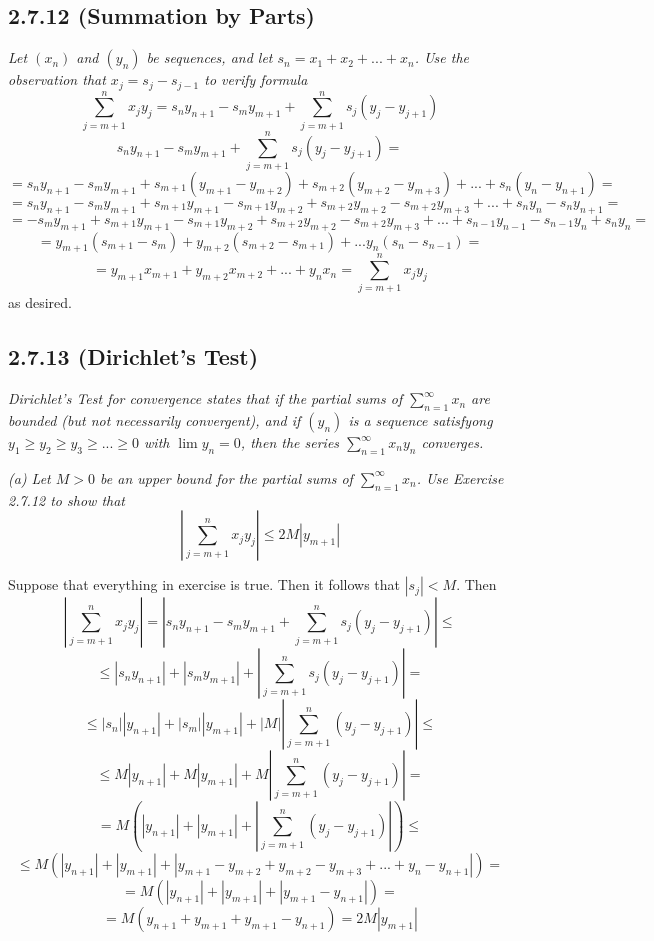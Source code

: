 \documentclass[11pt,oneside,titlepage]{book}
\begin{document}
\subsection*{2.7.12 (Summation by Parts)}
\textit{Let $(x_n)$ and $(y_n)$ be sequences, and let
  $s_n = x_1 + x_2 + ... + x_n$. Use the observation that
  $x_j = s_j - s_{j - 1}$ to verify formula }
$$\sum_{j = m + 1}^{n} x_j y_j = s_n y_{n + 1} - s_m y_{m + 1} +
\sum_{j = m + 1}^{n} s_j (y_j - y_{j + 1})$$
$$s_n y_{n + 1} - s_m y_{m + 1} +
\sum_{j = m + 1}^{n} s_j (y_j - y_{j + 1}) = $$
$$ = s_n y_{n + 1} - s_m y_{m + 1} +
s_{m + 1} (y_{m + 1} - y_{m + 2}) +
s_{m + 2} (y_{m + 2} - y_{m + 3}) +
... +
s_{n} (y_{n} - y_{n + 1}) = $$
$$ = s_n y_{n + 1} - s_m y_{m + 1} +
s_{m + 1} y_{m + 1} - s_{m + 1} y_{m + 2} +
s_{m + 2} y_{m + 2} - s_{m + 2} y_{m + 3} +
... +
s_{n} y_{n} - s_{n} y_{n + 1} = $$
$$ =  - s_m y_{m + 1} +
s_{m + 1} y_{m + 1} - s_{m + 1} y_{m + 2} +
s_{m + 2} y_{m + 2} - s_{m + 2} y_{m + 3} +
... + s_{n - 1} y_{n - 1} - s_{n - 1} y_{n}
+ s_{n} y_{n}  = $$
$$ =  y_{m + 1}(s_{m + 1} - s_m ) +
y_{m + 2}(s_{m + 2} - s_{m + 1} ) +
...   y_{n}( s_{n} - s_{n - 1})  = $$
$$ = y_{m + 1} x_{m + 1} +
y_{m + 2} x_{m + 2} + ... +
y_{n}x_n = \sum_{j = m + 1}^{n} x_j y_j
$$
as desired.

\subsection*{2.7.13 (Dirichlet's Test)}
\textit{Dirichlet's Test for convergence states that if the partial sums of
  $\sum_{n = 1}^{\infty} x_n$ are bounded (but not necessarily convergent), and
  if $(y_n)$ is a sequence satisfyong $y_1 \geq y_2 \geq y_3 \geq ... \geq 0 $
  with $\lim y_n = 0$, then the series $\sum_{n=1}^{\infty} x_n y_n$ converges.
}

\textit{(a) Let $M > 0$ be an upper bound for the partial sums of
  $\sum_{n = 1}^{\infty} x_n$. Use Exercise 2.7.12 to show that }
$$\left|\sum_{j = m + 1}^{n} x_j y_j\right| \leq 2M|y_{m + 1}|$$

Suppose that everything in exercise is true. Then it follows that
$|s_j| < M$. Then
$$\left|\sum_{j = m + 1}^{n} x_j y_j\right| =
\left|s_n y_{n + 1} - s_m y_{m + 1} + \sum_{j = m + 1}^{n}{s_j (y_j - y_{j + 1})} \right| \leq$$
$$\leq \left|s_n y_{n + 1}\right| + \left|s_m y_{m + 1}\right| + \left|\sum_{j = m + 1}^{n}{s_j (y_j - y_{j + 1})} \right| = $$
$$\leq |s_n| |y_{n + 1}| + |s_m|| y_{m + 1}| + |M|\left|\sum_{j = m + 1}^{n}{ (y_j - y_{j + 1})} \right| \leq $$
$$\leq M |y_{n + 1}| + M| y_{m + 1}| + M\left|\sum_{j = m + 1}^{n}{ (y_j - y_{j + 1})} \right| =$$
$$=  M \left(|y_{n + 1}| + | y_{m + 1}| + \left|\sum_{j = m + 1}^{n}{ (y_j - y_{j + 1})} \right|\right) \leq
$$
$$\leq  M \left(|y_{n + 1}| + | y_{m + 1}| + \left| y_{m + 1} - y_{m + 2} + y_{m + 2} - y_{m + 3} +  ... + y_n - y_{n + 1}\right|\right) =$$
$$=  M \left(|y_{n + 1}| + | y_{m + 1}| + \left| y_{m + 1} - y_{n + 1}\right|\right) = $$
$$=  M \left(y_{n + 1} +  y_{m + 1} + y_{m + 1} - y_{n + 1}\right) = 2M|y_{m + 1}|$$
\end{document}
